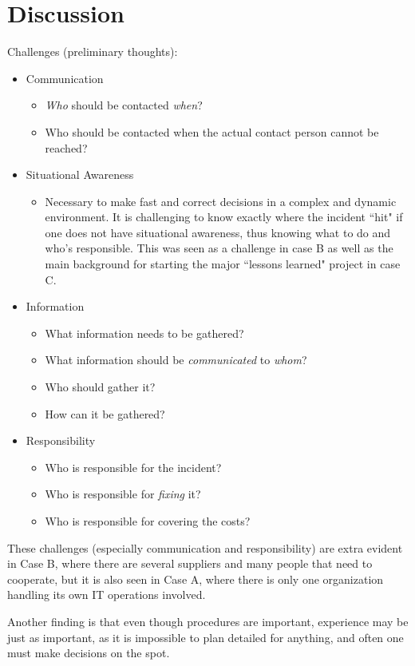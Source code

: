 \chapter{Discussion}

Challenges (preliminary thoughts):
\begin{itemize}
\item Communication
\begin{itemize}
\item \textit{Who} should be contacted \textit{when}?
\item Who should be contacted when the actual contact person cannot be reached?
\end{itemize}
\item Situational Awareness
\begin{itemize}
\item Necessary to make fast and correct decisions in a complex and dynamic environment. It is challenging to know exactly where the incident ``hit" if one does not have situational awareness, thus knowing what to do and who's responsible. This was  seen as a challenge in case B as well as the main background for starting the major ``lessons learned" project in case C.
\end{itemize}
\item Information
\begin{itemize}
\item What information needs to be gathered?
\item What information should be \textit{communicated} to \textit{whom}?
\item Who should gather it?
\item How can it be gathered?
\end{itemize}
\item Responsibility
\begin{itemize}
\item Who is responsible for the incident?
\item Who is responsible for \textit{fixing} it?
\item Who is responsible for covering the costs?
\end{itemize}
\end{itemize}

These challenges (especially communication and responsibility) are extra evident in Case B, where there are several suppliers and many people that need to cooperate, but it is also seen in Case A, where there is only one organization handling its own IT operations involved.

Another finding is that even though procedures are important, experience may be just as important, as it is impossible to plan detailed for anything, and often one must make decisions on the spot.